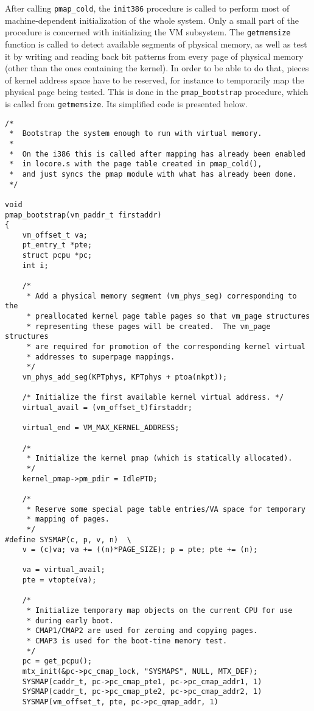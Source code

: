 \documentclass[shortabstract, english]{iithesis}
\newenvironment{code}{}{}
\begin{document}
After calling \texttt{pmap_cold}, the \texttt{init386} procedure
is called to perform most of machine-dependent initialization of the whole
system. Only a small part of the procedure is concerned with initializing the VM
subsystem. The \texttt{getmemsize} function is called to detect available
segments of physical memory, as well as test it by writing and reading back bit
patterns from every page of physical memory (other than the ones containing the
kernel). In order to be able to do that, pieces of kernel address space have to
be reserved, for instance to temporarily map the physical page being tested.
This is done in the \texttt{pmap_bootstrap} procedure, which is called
from \texttt{getmemsize}. Its simplified code is presented below.

\begin{code}
\begin{verbatim}
/*
 *  Bootstrap the system enough to run with virtual memory.
 *
 *  On the i386 this is called after mapping has already been enabled
 *  in locore.s with the page table created in pmap_cold(),
 *  and just syncs the pmap module with what has already been done.
 */

void
pmap_bootstrap(vm_paddr_t firstaddr)
{
    vm_offset_t va;
    pt_entry_t *pte;
    struct pcpu *pc;
    int i;

    /*
     * Add a physical memory segment (vm_phys_seg) corresponding to the
     * preallocated kernel page table pages so that vm_page structures
     * representing these pages will be created.  The vm_page structures
     * are required for promotion of the corresponding kernel virtual
     * addresses to superpage mappings.
     */
    vm_phys_add_seg(KPTphys, KPTphys + ptoa(nkpt));

    /* Initialize the first available kernel virtual address. */
    virtual_avail = (vm_offset_t)firstaddr;

    virtual_end = VM_MAX_KERNEL_ADDRESS;

    /*
     * Initialize the kernel pmap (which is statically allocated).
     */
    kernel_pmap->pm_pdir = IdlePTD;

    /*
     * Reserve some special page table entries/VA space for temporary
     * mapping of pages.
     */
#define SYSMAP(c, p, v, n)  \
    v = (c)va; va += ((n)*PAGE_SIZE); p = pte; pte += (n);

    va = virtual_avail;
    pte = vtopte(va);

    /*
     * Initialize temporary map objects on the current CPU for use
     * during early boot.
     * CMAP1/CMAP2 are used for zeroing and copying pages.
     * CMAP3 is used for the boot-time memory test.
     */
    pc = get_pcpu();
    mtx_init(&pc->pc_cmap_lock, "SYSMAPS", NULL, MTX_DEF);
    SYSMAP(caddr_t, pc->pc_cmap_pte1, pc->pc_cmap_addr1, 1)
    SYSMAP(caddr_t, pc->pc_cmap_pte2, pc->pc_cmap_addr2, 1)
    SYSMAP(vm_offset_t, pte, pc->pc_qmap_addr, 1)


\end{verbatim}
\end{code}
\end{document}

